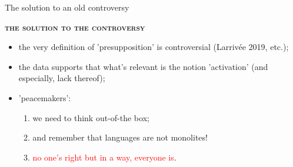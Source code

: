 \documentclass[lesson_slides]{subfiles}
\begin{document}
\begin{frame}[c]{The solution to an old controversy}

        \noindent \textbf{\textsc{the solution to the controversy}}
        \pause
        \begin{itemize}
            \item[\ding{227}] the very definition of 'presupposition' is controversial (Larrivée 2019, etc.); \pause
            \item[\ding{227}] the data supports that what's relevant is the notion 'activation' \pause (and especially, lack thereof); \pause
            \item[\ding{227}] 'peacemakers': \pause
            \begin{enumerate}
                \item we need to think out-of-the box; \pause
                \item and remember that languages are not monolites! \pause
                \item \textcolor{red}{no one's right but in a way, everyone is}.
            \end{enumerate}
        \end{itemize}

\end{frame}
\end{document}
